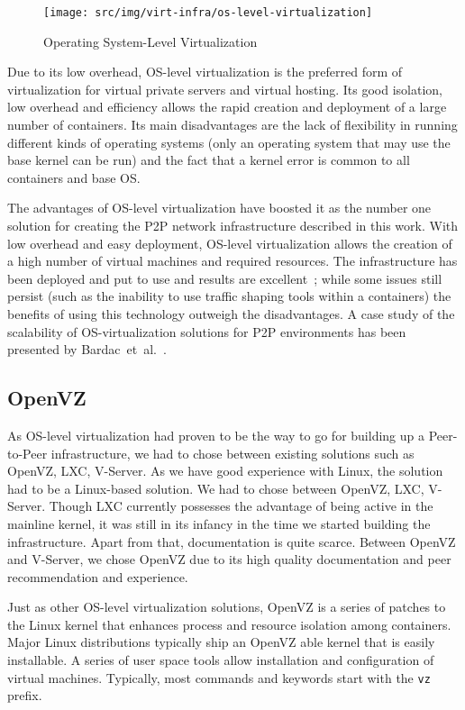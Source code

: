 \begin{figure}
  \centering
  \texttt{[image: src/img/virt-infra/os-level-virtualization]}
  \caption{Operating System-Level Virtualization}
  \label{fig:virt-infra:os-level-virtualization}
\end{figure}

Due to its low overhead, OS-level virtualization is the preferred form of
virtualization for virtual private servers and virtual hosting. Its good
isolation, low overhead and efficiency allows the rapid creation and
deployment of a large number of containers. Its main disadvantages are the
lack of flexibility in running different kinds of operating systems (only an
operating system that may use the base kernel can be run) and the fact that a
kernel error is common to all containers and base OS.

The advantages of OS-level virtualization have boosted it as the number one
solution for creating the P2P network infrastructure described in this work.
With low overhead and easy deployment, OS-level virtualization allows the
creation of a high number of virtual machines and required resources. The
infrastructure has been deployed and put to use and results are
excellent~\cite{p2p-va};
while some issues still persist (such as the inability to use traffic shaping
tools within a containers) the benefits of using this technology outweigh the
disadvantages. A case study of the scalability of OS-virtualization solutions
for P2P environments has been presented by
Bardac~et~al.~\cite{p2p-virt-scaling}.

\subsection{OpenVZ}

As OS-level virtualization had proven to be the way to go for building up a
Peer-to-Peer infrastructure, we had to chose between existing solutions such
as OpenVZ, LXC, V-Server. As we have good experience with Linux, the solution
had to be a Linux-based solution. We had to chose between OpenVZ, LXC,
V-Server. Though LXC currently possesses the advantage of being active in the
mainline kernel, it was still in its infancy in the time we started building
the infrastructure. Apart from that, documentation is quite scarce. Between
OpenVZ and V-Server, we chose OpenVZ due to its high quality documentation
and peer recommendation and experience.

Just as other OS-level virtualization solutions, OpenVZ is a series of patches
to the Linux kernel that enhances process and resource isolation among
containers. Major Linux distributions typically ship an OpenVZ able kernel that
is easily installable. A series of user space tools allow installation and
configuration of virtual machines. Typically, most commands and keywords start
with the \texttt{vz} prefix.

